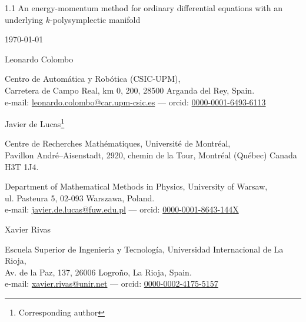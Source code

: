\documentclass[11pt]{article}
\theoremstyle{plain}
\theoremstyle{definition}
\numberwithin{equation}{section}
\begin{document}
\parskip=3pt




\vspace{5em}

{\huge\sffamily\raggedright
\begin{spacing}{1.1}
    An energy-momentum method for ordinary differential equations with an underlying $k$-polysymplectic manifold
\end{spacing}
}
\vspace{2em}

{\large\raggedright
    \today
}

\vspace{3em}


{\Large\raggedright\sffamily
    Leonardo Colombo
}\vspace{1mm}\newline
{\raggedright
    Centro de Automática y Robótica (CSIC-UPM),\\ 
    Carretera de Campo Real, km 0, 200, 28500 Arganda del Rey, Spain.\\
    e-mail: \href{mailto:leonardo.colombo@car.upm-csic.es}{leonardo.colombo@car.upm-csic.es} --- orcid: \href{https://orcid.org/0000-0001-6493-6113}{0000-0001-6493-6113}
}

\bigskip


{\Large\raggedright\sffamily
    Javier de Lucas\footnote{Corresponding author}
}\vspace{1mm}\newline
{\raggedright
    Centre de Recherches Math\'ematiques, Universit\'e de Montr\'eal,\\
    Pavillon André--Aisenstadt, 2920, chemin de la Tour,  Montréal (Québec) Canada  H3T 1J4.\\
    \medskip
    
    Department of Mathematical Methods in Physics, University of Warsaw,\\ul. Pasteura 5, 02-093 Warszawa, Poland.\\
    e-mail: \href{mailto:javier.de.lucas@fuw.edu.pl}{javier.de.lucas@fuw.edu.pl} --- orcid: \href{https://orcid.org/0000-0001-8643-144X}{0000-0001-8643-144X}
}

\bigskip

{\Large\raggedright\sffamily
    Xavier Rivas
}\vspace{1mm}\newline
{\raggedright
    Escuela Superior de Ingeniería y Tecnología, Universidad Internacional de La Rioja,\\
    Av. de la Paz, 137, 26006 Logroño, La Rioja, Spain.\\
    e-mail: \href{mailto:xavier.rivas@unir.net}{xavier.rivas@unir.net} --- orcid: \href{https://orcid.org/0000-0002-4175-5157}{0000-0002-4175-5157}
}
\end{document}
